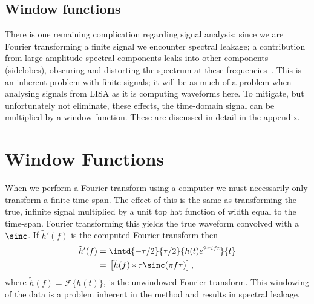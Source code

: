 \subsection{Window functions}

There is one remaining complication regarding signal analysis: since we are Fourier transforming a finite signal we encounter spectral leakage; a contribution from large amplitude spectral components leaks into other components (sidelobes), obscuring and distorting the spectrum at these frequencies~\citep{Harris1978}. This is an inherent problem with finite signals; it will be as much of a problem when analysing signals from LISA as it is computing waveforms here. To mitigate, but unfortunately not eliminate, these effects, the time-domain signal can be multiplied by a window function. These are discussed in detail in the appendix.

\appendix

\section[]{Window Functions}

When we perform a Fourier transform using a computer we must necessarily only transform a finite time-span. The effect of this is the same as transforming the true, infinite signal multiplied by a unit top hat function of width equal to the time-span. Fourier transforming this yields the true waveform convolved with a $\sinc$. If $\tilde{h}'(f)$ is the computed Fourier transform then
\begin{align}
\tilde{h}'(f) = {} & \intd{-\tau/2}{\tau/2}{h(t)e^{2\pi i ft}}{t} \\
 = {} & \left[\tilde{h}(f) \ast \tau \sinc(\pi f\tau)\right],
\end{align}
where $\tilde{h}(f) = \mathscr{F}\{h(t)\}$, is the unwindowed Fourier transform. This windowing of the data is a problem inherent in the method and results in spectral leakage.

